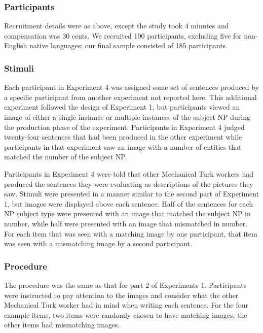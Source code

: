 \documentclass[10pt,letterpaper]{article}
\begin{document}
\subsubsection{Participants}

Recruitment details were as above, except the study took 4 minutes and compensation was 30 cents. We recruited 190 participants, excluding five for non-English native languages; our final sample consisted of 185 participants.

\subsubsection{Stimuli}

Each participant in Experiment 4 was assigned some set of sentences produced by a specific participant from another experiment not reported here. This additional experiment followed the design of Experiment 1, but participants viewed an image of either a single instance or multiple instances of the subject NP during the production phase of the experiment. Participants in Experiment 4 judged twenty-four sentences that had been produced in the other experiment while participants in that experiment saw an image with a number of entities that matched the number of the subject NP.

Participants in Experiment 4 were told that other Mechanical Turk workers had produced the sentences they were evaluating as descriptions of the pictures they saw. Stimuli were presented in a manner similar to the second part of Experiment 1, but images were displayed above each sentence. Half of the sentences for each NP subject type were presented with an image that matched the subject NP in number, while half were presented with an image that mismatched in number. For each item that was seen with a matching image by one participant, that item was seen with a mismatching image by a second participant.

\subsubsection{Procedure}

The procedure was the same as that for part 2 of Experiments 1. Participants were instructed to pay attention to the images and consider what the other Mechanical Turk worker had in mind when writing each sentence. For the four example items, two items were randomly chosen to have matching images, the other items had mismatching images.
\end{document}
